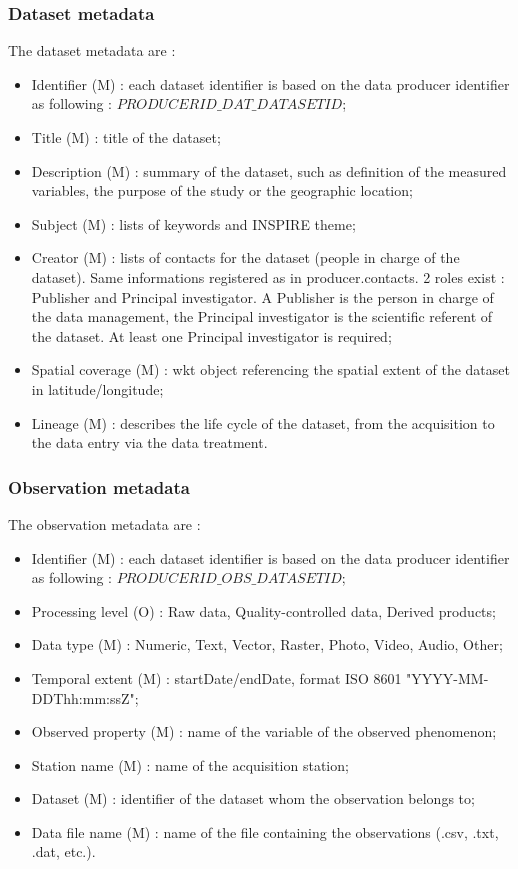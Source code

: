 \subsubsection{Dataset metadata}

The dataset metadata are : 

\begin{itemize}
\item 	 Identifier (M) : each dataset identifier is based on the data producer identifier as following : $PRODUCERID\_DAT\_DATASETID$;
\item 	 Title (M) : title of the dataset;
\item 	 Description (M) : summary of the dataset, such as definition of the measured variables, the purpose of the study or the geographic location;
\item 	 Subject (M) : lists of keywords and INSPIRE theme;
\item 	 Creator (M) : lists of contacts for the dataset (people in charge of the dataset). Same informations registered as in producer.contacts. 2 roles exist : Publisher and Principal investigator. A Publisher is the person in charge of the data management, the Principal investigator is the scientific referent of the dataset. At least one Principal investigator is required;
\item 	 Spatial coverage (M) : wkt object referencing the spatial extent of the dataset in latitude/longitude;
\item 	 Lineage (M) : describes the life cycle of the dataset, from the acquisition to the data entry via the data treatment.
\end{itemize}

\subsubsection{Observation metadata}

The observation metadata are : 

\begin{itemize}
\item 	 Identifier (M) : each dataset identifier is based on the data producer identifier as following : $PRODUCERID\_OBS\_DATASETID$;
\item 	 Processing level (O) : Raw data, Quality-controlled data, Derived products;
\item 	 Data type (M) : Numeric, Text, Vector, Raster, Photo, Video, Audio, Other;
\item 	 Temporal extent (M) : startDate/endDate, format ISO 8601 "YYYY-MM-DDThh:mm:ssZ";
\item 	 Observed property (M) : name of the variable of the observed phenomenon;
\item 	 Station name (M) : name of the acquisition station;
\item 	 Dataset (M) : identifier of the dataset whom the observation belongs to;
\item 	 Data file name (M) : name of the file containing the observations (.csv, .txt, .dat, etc.).
\end{itemize}

